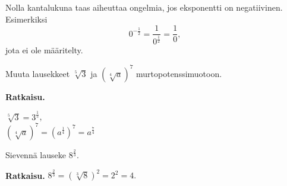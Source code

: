 Nolla kantalukuna taas aiheuttaa ongelmia, jos eksponentti on negatiivinen. Esimerkiksi
\[
 0^{-\tfrac{1}{2}}=\frac{1}{0^\frac{1}{2}}=\frac{1}{0}, %
\]
jota ei ole määritelty.

\begin{esimerkki}
Muuta lausekkeet $\sqrt[5]{3}$ ja $(\sqrt[4]{a})^7$ murtopotenssimuotoon.

{\bf Ratkaisu.}

$\sqrt[5]{3} = 3^\frac{1}{5}$, \\
$(\sqrt[4]{a})^7 = (a^\frac{1}{4})^7=a^\frac{7}{4}$
\end{esimerkki}

\begin{esimerkki}
Sievennä lauseke $8^\frac{2}{3}$.

{\bf Ratkaisu.}
 $8^\frac{2}{3} = (\sqrt[3]{8})^2 = 2^2 = 4.$
\end{esimerkki}

